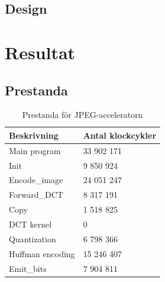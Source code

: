 \documentclass[a4paper]{article}
\begin{document}
\subsection{Design}


\section{Resultat}

\subsection{Prestanda}

\begin{table}[ht]
    \centering
    \begin{tabular}{l l}
    
        Beskrivning & Antal klockcykler\\
        \hline
        Main program  & 33 902 171 \\
        Init  &  9 850 924 \\
        Encode\_image  & 24 051 247 \\
        Forward\_DCT  & 8 317 191 \\
        Copy  & 1 518 825 \\
        DCT kernel  & 0 \\
        Quantization  & 6 798 366 \\
        Huffman encoding  & 15 246 407 \\
        Emit\_bits  &  7 904 811 \\
    \end{tabular}
    \caption{ Prestanda för JPEG-acceleratorn }
    \label{tab:jpeg_performance_2}
\end{table}
\end{document}
